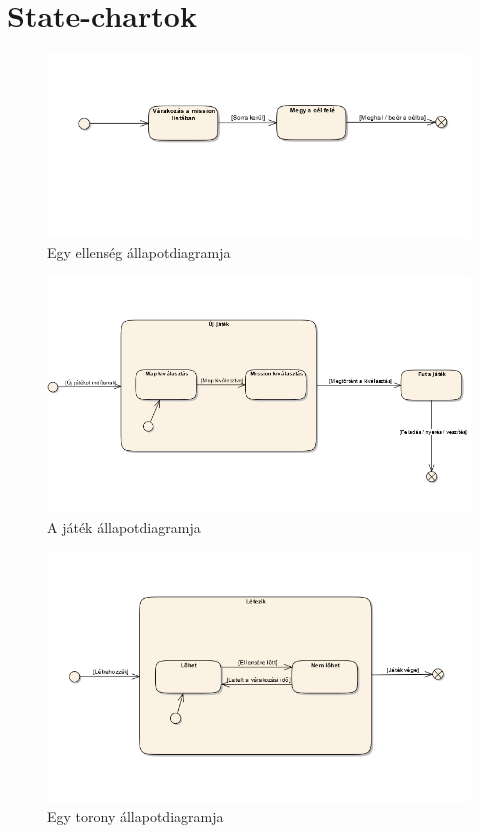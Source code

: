 \pagebreak
\section{State-chartok}

\begin{figure}[H]
\begin{center}
\includegraphics[width=15cm]{images/enemy_state.png}
\caption{Egy ellenség állapotdiagramja}
\label{fig:enemy_state}
\end{center}
\end{figure}

\begin{figure}[H]
\begin{center}
\includegraphics[width=15cm]{images/game_state.png}
\caption{A játék állapotdiagramja}
\label{fig:game_state}
\end{center}
\end{figure}

\begin{figure}[H]
\begin{center}
\includegraphics[width=15cm]{images/tower_state.png}
\caption{Egy torony állapotdiagramja}
\label{fig:tower_state}
\end{center}
\end{figure}

